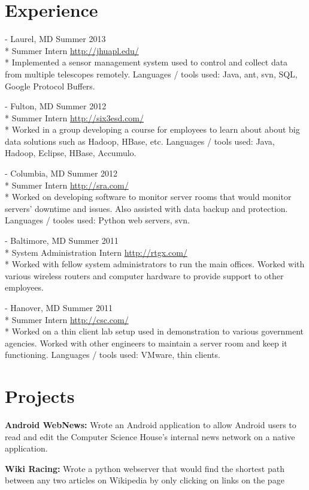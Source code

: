 \documentclass[a4paper,margin,line,11pt]{resume}
\newcommand{\rurl}[1]{\hfill {\footnotesize \url{#1}}}
\newcommand{\rdate}[1]{\hfill {\small #1}}
\renewcommand{\employer}[5]{\item[#1] - #2 \rdate{#3} \\* #4 \rurl{#5} \\*}
\begin{document}
\begin{resume}
\section{\mysidestyle Experience}
	\begin{asparadesc}
		\employer{John Hopkins University Applied Physics Laboratory}{Laurel, MD}{Summer 2013}{Summer Intern}{http://jhuapl.edu/}
		Implemented a sensor management system used to control and collect data from multiple telescopes remotely. Languages / tools used: Java, ant, svn, SQL, Google Protocol Buffers.
		\normalsize
		\\
		\employer{Six3 Systems, Inc.}{Fulton, MD}{Summer 2012}{Summer Intern}{http://six3esd.com/}
		Worked in a group developing a course for employees to learn about about big data solutions such as Hadoop, HBase, etc. Languages / tools used: Java, Hadoop, Eclipse, HBase, Accumulo.  
		\normalsize
		\\
		\employer{SRA, International}{Columbia, MD}{Summer 2012}{Summer Intern}{http://sra.com/}
		Worked on developing software to monitor server rooms that would monitor servers' downtime and issues. Also assisted with data backup and protection. Languages / tooles used: Python web servers, svn.
		\normalsize
		\\
		\employer{RTGX - Ross Technology, Inc}{Baltimore, MD}{Summer 2011}{System Administration Intern}{http://rtgx.com/}
		Worked with fellow system administrators to run the main offices. Worked with various wireless routers and computer hardware to provide support to other employees. 
		\normalsize
		\\
		\employer{Computer Science Corporation}{Hanover, MD}{Summer 2011}{Summer Intern}{http://csc.com/}
		Worked on a thin client lab setup used in demonstration to various government agencies. Worked with other engineers to maintain a server room and keep it functioning. Languages / tools used: VMware, thin clients.
		\normalsize
	\end{asparadesc}


\section{\mysidestyle Projects}
    \begin{asparablank}
        \item {\bf Android WebNews:} Wrote an Android application to allow Android users to read and edit the Computer Science House's internal news network on a native application.
        \normalsize
        \\
        \item {\bf Wiki Racing:} Wrote a python webserver that would find the shortest path between any two articles on Wikipedia by only clicking on links on the page
        \normalsize
    \end{asparablank}

\end{resume}
\end{document}
